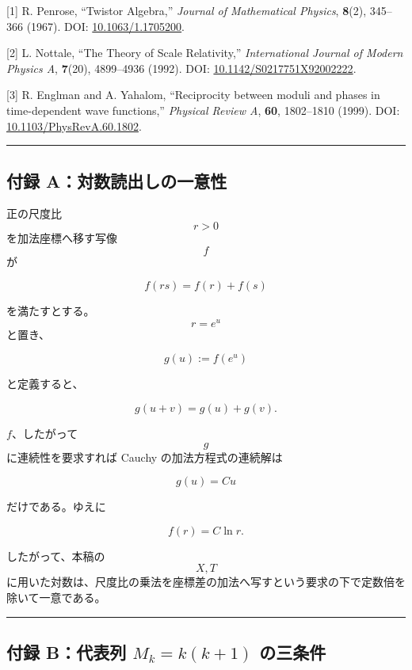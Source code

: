 \documentclass[
  a4paper,
]{ltjsarticle}
\begin{document}
{[}1{]} R. Penrose, ``Twistor Algebra,'' \emph{Journal of Mathematical
Physics}, \textbf{8}(2), 345--366 (1967). DOI:
\href{https://doi.org/10.1063/1.1705200}{10.1063/1.1705200}.

{[}2{]} L. Nottale, ``The Theory of Scale Relativity,''
\emph{International Journal of Modern Physics A}, \textbf{7}(20),
4899--4936 (1992). DOI:
\href{https://doi.org/10.1142/S0217751X92002222}{10.1142/S0217751X92002222}.

{[}3{]} R. Englman and A. Yahalom, ``Reciprocity between moduli and
phases in time-dependent wave functions,'' \emph{Physical Review A},
\textbf{60}, 1802--1810 (1999). DOI:
\href{https://doi.org/10.1103/PhysRevA.60.1802}{10.1103/PhysRevA.60.1802}.

\begin{center}\rule{0.5\linewidth}{0.5pt}\end{center}

\subsection{付録
A：対数読出しの一意性}\label{ux4ed8ux9332-aux5bfeux6570ux8aadux51faux3057ux306eux4e00ux610fux6027}

正の尺度比 \[r>0\] を加法座標へ移す写像 \[f\] が

\[
f(rs)=f(r)+f(s)
\tag{A1}
\]

を満たすとする。\[r=e^u\] と置き、

\[
g(u):=f(e^u)
\]

と定義すると、

\[
g(u+v)=g(u)+g(v).
\tag{A2}
\]

\(f\)、したがって \[g\] に連続性を要求すれば Cauchy
の加法方程式の連続解は

\[
g(u)=Cu
\]

だけである。ゆえに

\[
\boxed{
f(r)=C\ln r.
}
\tag{A3}
\]

したがって、本稿の \[X,T\]
に用いた対数は、尺度比の乗法を座標差の加法へ写すという要求の下で定数倍を除いて一意である。

\begin{center}\rule{0.5\linewidth}{0.5pt}\end{center}

\subsection{\texorpdfstring{付録 B：代表列 \(M_k=k(k+1)\)
の三条件}{付録 B：代表列 M\_k=k(k+1) の三条件}}\label{ux4ed8ux9332-bux4ee3ux8868ux5217-m_kkk1-ux306eux4e09ux6761ux4ef6}
\end{document}
